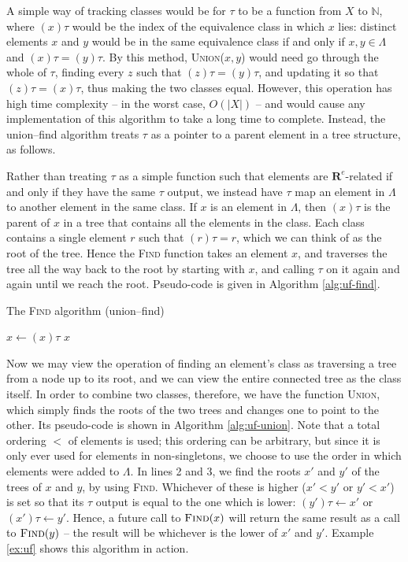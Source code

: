 A simple way of tracking classes would be for $\tau$ to be a function from $X$
to $\mathbb{N}$, where $(x)\tau$ would be the index of the equivalence class in
which $x$ lies: distinct elements $x$ and $y$ would be in the same equivalence
class if and only if $x,y \in \Lambda$ and $(x)\tau = (y)\tau$.  By this method,
\textsc{Union($x,y$)} would need go through the whole of $\tau$, finding every
$z$ such that $(z)\tau = (y)\tau$, and updating it so that $(z)\tau = (x)\tau$,
thus making the two classes equal.  However, this operation has high time
complexity -- in the worst case, $O(|X|)$ -- and would cause any implementation
of this algorithm to take a long time to complete.  Instead, the union--find
algorithm treats $\tau$ as a pointer to a parent element in a tree structure, as
follows.

Rather than treating $\tau$ as a simple function such that elements are
$\mathbf{R}^e$-related if and only if they have the same $\tau$ output,
we instead have $\tau$ map an element in $\Lambda$ to another element in the
same class.  If $x$ is an element in $\Lambda$, then $(x)\tau$ is the parent of
$x$ in a tree that contains all the elements in the class.  Each class contains a
single element $r$ such that $(r)\tau = r$, which we can think of as the root of
the tree.  Hence the \textsc{Find} function takes an element $x$, and traverses
the tree all the way back to the root by starting with $x$, and calling $\tau$
on it again and again until we reach the root.
Pseudo-code is given in Algorithm \ref{alg:uf-find}.

\begin{algorithm}
\caption{The \textsc{Find} algorithm (union--find)}
\label{alg:uf-find}
  \begin{algorithmic}[1]
      \Repeat
        \State $x \gets (x)\tau$  
        
      \State \Return $x$
    \EndProcedure
  \end{algorithmic}
\end{algorithm}

Now we may view the operation of finding an element's class as traversing a tree
from a node up to its root, and we can view the entire connected tree as the
class itself.  In order to combine two classes, therefore, we have the function
\textsc{Union}, which simply finds the roots of the two trees and changes one to
point to the other.  Its pseudo-code is shown in Algorithm \ref{alg:uf-union}.
Note that a total ordering $<$ of elements is used; this ordering can be
arbitrary, but since it is only ever used for elements in non-singletons, we
choose to use the order in which elements were added to $\Lambda$.  In
lines 2 and 3, we find the roots $x'$ and $y'$ of the trees of $x$ and $y$, by
using \textsc{Find}.  Whichever of these is higher ($x' < y'$ or $y' < x'$) is
set so that its $\tau$ output is equal to the one which is lower:
$(y')\tau \gets x'$ or $(x')\tau \gets y'$.  Hence, a future call to
$\textsc{Find}(x)$ will return the same result as a call to $\textsc{Find}(y)$
-- the result will be whichever is the lower of $x'$ and $y'$.  Example
\ref{ex:uf} shows this algorithm in action.

